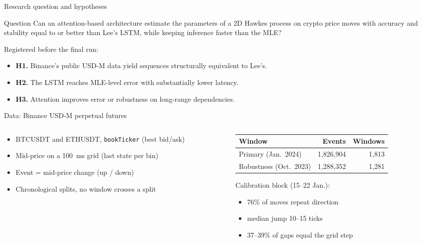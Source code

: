 \documentclass[aspectratio=169,11pt]{beamer}
\begin{document}
\begin{frame}{Research question and hypotheses}
  \begin{block}{Question}
    Can an attention-based architecture estimate the parameters of a 2D Hawkes process on
    crypto price moves with accuracy and stability equal to or better than Lee's LSTM,
    while keeping inference faster than the MLE?
  \end{block}
  \medskip
  Registered before the final run:
  \begin{itemize}
    \item \textbf{H1.} Binance's public USD-M data yield sequences structurally equivalent
          to Lee's.
    \item \textbf{H2.} The LSTM reaches MLE-level error with substantially lower latency.
    \item \textbf{H3.} Attention improves error or robustness on long-range dependencies.
  \end{itemize}
\end{frame}

\begin{frame}{Data: Binance USD-M perpetual futures}
  \begin{columns}[T]
    \begin{column}{0.44\textwidth}
      \begin{itemize}
        \item BTCUSDT and ETHUSDT, \texttt{bookTicker} (best bid/ask)
        \item Mid-price on a \alert{100~ms grid} (last state per bin)
        \item Event = mid-price change (up / down)
        \item Chronological splits, no window crosses a split
      \end{itemize}
    \end{column}
    \begin{column}{0.54\textwidth}
      \footnotesize
      \begin{tabular}{lrr}
        \toprule
        Window & Events & Windows\\
        \midrule
        Primary (Jan.\ 2024) & 1,826,904 & 1,813\\
        Robustness (Oct.\ 2023) & 1,288,352 & 1,281\\
        \bottomrule
      \end{tabular}
      \par\medskip
      Calibration block (15--22 Jan.):
      \begin{itemize}
        \item 76\% of moves repeat direction
        \item median jump 10--15 ticks
        \item 37--39\% of gaps equal the grid step
      \end{itemize}
    \end{column}
  \end{columns}
\end{frame}
\end{document}
